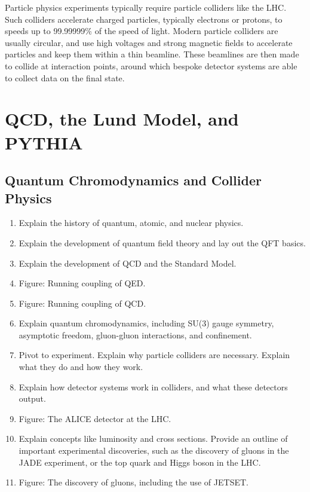 \documentclass[12pt,a4paper]{report}
\begin{document}
Particle physics experiments typically require particle colliders like the LHC. Such colliders accelerate charged particles, typically electrons or protons, to speeds up to 99.99999\% of the speed of light. Modern particle colliders are usually circular, and use high voltages and strong magnetic fields to accelerate particles and keep them within a thin beamline. These beamlines are then made to collide at interaction points, around which bespoke detector systems are able to collect data on the final state. 

\chapter{QCD, the Lund Model, and PYTHIA}

\section{Quantum Chromodynamics and Collider Physics}
\begin{enumerate}
\item Explain the history of quantum, atomic, and nuclear physics.
\item Explain the development of quantum field theory and lay out the QFT basics.
\item Explain the development of QCD and the Standard Model.
\item Figure: Running coupling of QED.
\item Figure: Running coupling of QCD.
\item Explain quantum chromodynamics, including SU(3) gauge symmetry, asymptotic freedom, gluon-gluon interactions, and confinement.
\item Pivot to experiment. Explain why particle colliders are necessary. Explain what they do and how they work.
\item Explain how detector systems work in colliders, and what these detectors output.
\item Figure: The ALICE detector at the LHC.
\item Explain concepts like luminosity and cross sections. Provide an outline of important experimental discoveries, such as the discovery of gluons in the JADE experiment, or the top quark and Higgs boson in the LHC.
\item Figure: The discovery of gluons, including the use of JETSET.
\end{enumerate}
\end{document}
